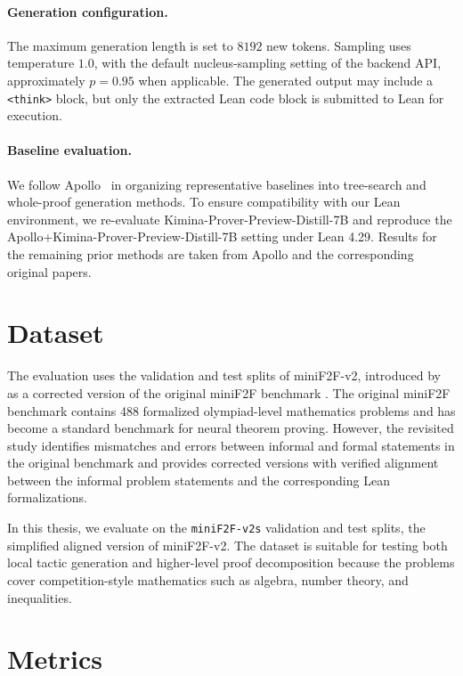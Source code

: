 \paragraph{Generation configuration.}
The maximum generation length is set to \(8192\) new tokens. Sampling uses temperature \(1.0\), with
the default nucleus-sampling setting of the backend API, approximately \(p=0.95\) when applicable.
The generated output may include a \texttt{<think>} block, but only the extracted Lean code block is
submitted to Lean for execution.

\paragraph{Baseline evaluation.}
We follow Apollo~\citep{apollo} in organizing representative baselines into tree-search and
whole-proof generation methods. To ensure compatibility with our Lean environment, we re-evaluate
Kimina-Prover-Preview-Distill-7B and reproduce the Apollo+Kimina-Prover-Preview-Distill-7B setting
under Lean 4.29. Results for the remaining prior methods are taken from Apollo and the corresponding
original papers.

\section{Dataset}

The evaluation uses the validation and test splits of miniF2F-v2, introduced by
\citet{ospanov2025minif2fLeanRevisited} as a corrected version of the original miniF2F benchmark
\citep{zheng2021minif2f}. The original miniF2F benchmark contains 488 formalized olympiad-level
mathematics problems and has become a standard benchmark for neural theorem proving. However,
the revisited study identifies mismatches and errors between informal and formal statements in the
original benchmark and provides corrected versions with verified alignment between the informal
problem statements and the corresponding Lean formalizations.

In this thesis, we evaluate on the \texttt{miniF2F-v2s} validation and test splits, the simplified aligned version of miniF2F-v2. The dataset is suitable for
testing both local tactic generation and higher-level proof decomposition because the problems cover
competition-style mathematics such as algebra, number theory, and inequalities.

\section{Metrics}

